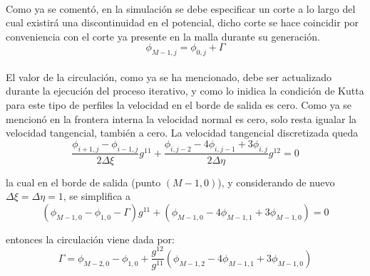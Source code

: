 \documentclass[letterpaper, openright, 12pt]{book}
\begin{document}
    \paragraph*{}
        Como ya se comentó, en la simulación se debe especificar un corte a lo
        largo del cual existirá una discontinuidad en el potencial, dicho corte
        se hace coincidir por conveniencia con el corte ya presente en la malla
        durante su generación.
        \begin{equation}
            \phi_{M - 1, j} = \phi_{0, j} + \Gamma
        \end{equation}

    \paragraph*{}
        El valor de la circulación, como ya se ha mencionado, debe ser
        actualizado durante la ejecución del proceso iterativo, y como lo
        inidica la condición de Kutta para este tipo de perfiles la velocidad
        en el borde de salida es cero. Como ya se mencionó en la frontera
        interna la velocidad normal es cero, solo resta igualar la velocidad
        tangencial, también a cero. La velocidad tangencial discretizada queda
        \begin{equation}
            \frac{\phi_{i+1, j} - \phi_{i-1, j}}{2 \Delta \xi} g^{11}
            + \frac{\phi_{i, j-2} - 4 \phi_{i, j-1} + 3 \phi_{i, j}}{2 \Delta \eta}
                g^{12} = 0
        \end{equation}

        la cual en el borde de salida (punto $(M -1, 0)$), y considerando de
        nuevo $\Delta \xi = \Delta \eta = 1$, se simplifica a
        \begin{equation}
            \left(\phi_{M-1, 0} - \phi_{1, 0} - \Gamma \right) g^{11}
            +  \left( \phi_{M-1, 0} - 4 \phi_{M-1, 1} + 3 \phi_{M-1, 0} \right)
            = 0
        \end{equation}

        entonces la circulación viene dada por:
        \begin{equation}
            \Gamma = \phi_{M-2, 0} - \phi_{1, 0}
                + \frac{g^{12}}{g^{11}} \left( \phi_{M-1, 2}
                - 4 \phi_{M-1, 1} + 3 \phi_{M-1, 0} \right)
        \end{equation}

%
%
%
%
%

%
%
%
%
%
\end{document}

